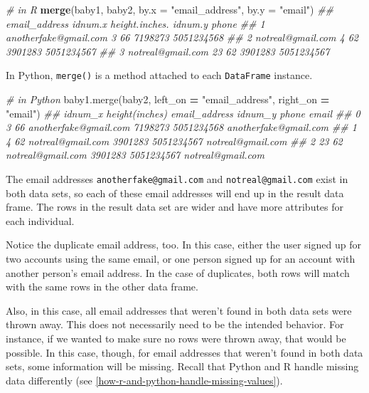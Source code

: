 \documentclass[12pt,krantz2]{krantz}
\makeatletter
\newenvironment{Shaded}{\begin{snugshade}}{\end{snugshade}}
\newcommand{\CommentTok}[1]{\textcolor[rgb]{0.37,0.37,0.37}{\textit{#1}}}
\newcommand{\DataTypeTok}[1]{\textcolor[rgb]{0.27,0.27,0.27}{#1}}
\newcommand{\KeywordTok}[1]{\textcolor[rgb]{0.27,0.27,0.27}{\textbf{#1}}}
\newcommand{\NormalTok}[1]{#1}
\newcommand{\OperatorTok}[1]{\textcolor[rgb]{0.43,0.43,0.43}{\textbf{#1}}}
\newcommand{\StringTok}[1]{\textcolor[rgb]{0.5,0.5,0.5}{#1}}
\newenvironment{kframe}{%
\medskip{}
\setlength{\fboxsep}{.8em}
 \def\at@end@of@kframe{}%
 \ifinner\ifhmode%
  \def\at@end@of@kframe{\end{minipage}}%
  \begin{minipage}{\columnwidth}%
 \fi\fi%
 \def\FrameCommand##1{\hskip\@totalleftmargin \hskip-\fboxsep
 \colorbox{shadecolor}{##1}\hskip-\fboxsep
     \hskip-\linewidth \hskip-\@totalleftmargin \hskip\columnwidth}%
 \MakeFramed {\advance\hsize-\width
   \@totalleftmargin\z@ \linewidth\hsize
   \@setminipage}}%
 {\par\unskip\endMakeFramed%
 \at@end@of@kframe}
\renewenvironment{Shaded}{\begin{kframe}}{\end{kframe}}
\makeatother
\begin{document}
\begin{Shaded}
\begin{Highlighting}[]
\CommentTok{# in R}
\KeywordTok{merge}\NormalTok{(baby1, baby2, }\DataTypeTok{by.x =} \StringTok{"email_address"}\NormalTok{, }\DataTypeTok{by.y =} \StringTok{"email"}\NormalTok{)}
\CommentTok{##           email_address idnum.x height.inches. idnum.y      phone}
\CommentTok{## 1 anotherfake@gmail.com       3             66 7198273 5051234568}
\CommentTok{## 2     notreal@gmail.com       4             62 3901283 5051234567}
\CommentTok{## 3     notreal@gmail.com      23             62 3901283 5051234567}
\end{Highlighting}
\end{Shaded}

In Python, \texttt{merge()} is a method attached to each \texttt{DataFrame} instance.

\begin{Shaded}
\begin{Highlighting}[]
\CommentTok{# in Python}
\NormalTok{baby1.merge(baby2, left_on }\OperatorTok{=} \StringTok{"email_address"}\NormalTok{, right_on }\OperatorTok{=} \StringTok{"email"}\NormalTok{)}
\CommentTok{##    idnum_x  height(inches)          email_address  idnum_y       phone                  email}
\CommentTok{## 0        3              66  anotherfake@gmail.com  7198273  5051234568  anotherfake@gmail.com}
\CommentTok{## 1        4              62      notreal@gmail.com  3901283  5051234567      notreal@gmail.com}
\CommentTok{## 2       23              62      notreal@gmail.com  3901283  5051234567      notreal@gmail.com}
\end{Highlighting}
\end{Shaded}

The email addresses \texttt{anotherfake@gmail.com} and \texttt{notreal@gmail.com} exist in both data sets, so each of these email addresses will end up in the result data frame. The rows in the result data set are wider and have more attributes for each individual.

Notice the duplicate email address, too. In this case, either the user signed up for two accounts using the same email, or one person signed up for an account with another person's email address. In the case of duplicates, both rows will match with the same rows in the other data frame.

Also, in this case, all email addresses that weren't found in both data sets were thrown away. This does not necessarily need to be the intended behavior. For instance, if we wanted to make sure no rows were thrown away, that would be possible. In this case, though, for email addresses that weren't found in both data sets, some information will be missing. Recall that Python and R handle missing data differently (see \ref{how-r-and-python-handle-missing-values}).
\end{document}
